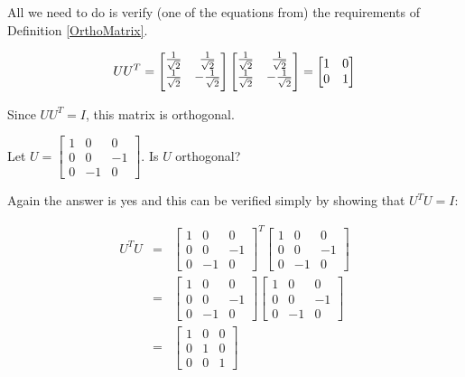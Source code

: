 \documentclass{ximera}
\begin{document}
\begin{explanation}
All we need to do is verify (one of the equations from) the requirements of Definition \ref{OrthoMatrix}.

\begin{equation*}
UU^{T}=\begin{bmatrix}
\frac{1}{\sqrt{2}} & \frac{1}{\sqrt{2}} \\
\vspace{0.05in}\frac{1}{\sqrt{2}} & -\frac{1}{\sqrt{2}}
\end{bmatrix} \begin{bmatrix}
\frac{1}{\sqrt{2}} & \frac{1}{\sqrt{2}} \\
\vspace{0.05in}\frac{1}{\sqrt{2}} & -\frac{1}{\sqrt{2}}
\end{bmatrix} = \begin{bmatrix}
1 & 0 \\
0 & 1
\end{bmatrix}
\end{equation*}

Since $UU^{T} = I$, this matrix is orthogonal.
\end{explanation}

\begin{example}\label{ex:OrthogonalMatrix2}
Let $U=\begin{bmatrix}
1 & 0 & 0 \\
0 & 0 & -1 \\
0 & -1 & 0
\end{bmatrix}.$ Is $U$ orthogonal?
\end{example}

\begin{explanation}
Again the answer is yes and this can be verified simply by showing that $U^{T}U=I$:

\begin{eqnarray*}
U^{T}U&=&\begin{bmatrix}
1 & 0 & 0 \\
0 & 0 & -1 \\
0 & -1 & 0
\end{bmatrix}^{T}\begin{bmatrix}
1 & 0 & 0 \\
0 & 0 & -1 \\
0 & -1 & 0
\end{bmatrix} \\
&=&\begin{bmatrix}
1 & 0 & 0 \\
0 & 0 & -1 \\
0 & -1 & 0
\end{bmatrix}
\begin{bmatrix}
1 & 0 & 0 \\
0 & 0 & -1 \\
0 & -1 & 0
\end{bmatrix} \\
&=&\begin{bmatrix}
1 & 0 & 0 \\
0 & 1 & 0 \\
0 & 0 & 1
\end{bmatrix}
\end{eqnarray*}
\end{explanation}
\end{document}
